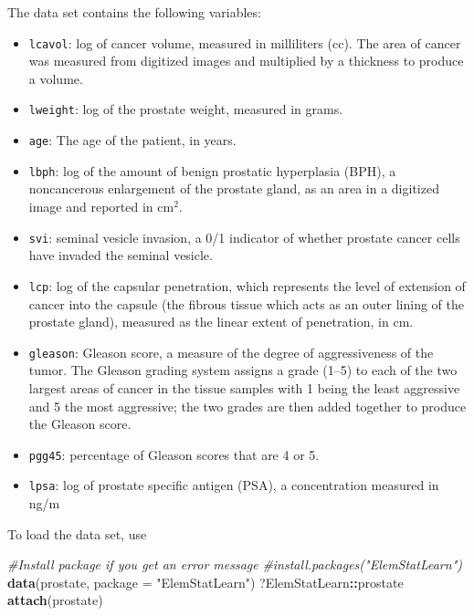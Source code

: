 \documentclass[]{book}
\newenvironment{Shaded}{\begin{snugshade}}{\end{snugshade}}
\newcommand{\CommentTok}[1]{\textcolor[rgb]{0.56,0.35,0.01}{\textit{#1}}}
\newcommand{\DataTypeTok}[1]{\textcolor[rgb]{0.13,0.29,0.53}{#1}}
\newcommand{\KeywordTok}[1]{\textcolor[rgb]{0.13,0.29,0.53}{\textbf{#1}}}
\newcommand{\NormalTok}[1]{#1}
\newcommand{\OperatorTok}[1]{\textcolor[rgb]{0.81,0.36,0.00}{\textbf{#1}}}
\newcommand{\StringTok}[1]{\textcolor[rgb]{0.31,0.60,0.02}{#1}}
\providecommand{\tightlist}{%
  \setlength{\itemsep}{0pt}\setlength{\parskip}{0pt}}
\theoremstyle{definition}
\theoremstyle{definition}
\theoremstyle{definition}
\theoremstyle{remark}
\begin{document}
The data set contains the following variables:

\begin{itemize}
\tightlist
\item
  \texttt{lcavol}: log of cancer volume, measured in milliliters (cc). The area of cancer was measured from digitized images and
  multiplied by a thickness to produce a volume.
\item
  \texttt{lweight}: log of the prostate weight, measured in grams.
\item
  \texttt{age}: The age of the patient, in years.
\item
  \texttt{lbph}: log of the amount of benign prostatic hyperplasia (BPH), a noncancerous enlargement of the prostate gland, as
  an area in a digitized image and reported in cm\({}^2\).
\item
  \texttt{svi}: seminal vesicle invasion, a 0/1 indicator of whether prostate cancer cells have invaded the seminal vesicle.
\item
  \texttt{lcp}: log of the capsular penetration, which represents the level of extension of cancer into the capsule (the fibrous
  tissue which acts as an outer lining of the prostate gland), measured as the linear extent of penetration, in cm.
\item
  \texttt{gleason}: Gleason score, a measure of the degree of aggressiveness of the tumor. The Gleason grading system assigns a
  grade (1--5) to each of the two largest areas of cancer in the tissue samples with 1 being the least aggressive and 5 the most
  aggressive; the two grades are then added together to produce the Gleason score.
\item
  \texttt{pgg45}: percentage of Gleason scores that are 4 or 5.
\item
  \texttt{lpsa}: log of prostate specific antigen (PSA), a concentration measured in ng/m
\end{itemize}

To load the data set, use

\begin{Shaded}
\begin{Highlighting}[]
\CommentTok{#Install package if you get an error message}
\CommentTok{#install.packages("ElemStatLearn")}
\KeywordTok{data}\NormalTok{(prostate, }\DataTypeTok{package =} \StringTok{"ElemStatLearn"}\NormalTok{)}
\NormalTok{?ElemStatLearn}\OperatorTok{::}\NormalTok{prostate}
\KeywordTok{attach}\NormalTok{(prostate) }
\end{Highlighting}
\end{Shaded}
\end{document}
